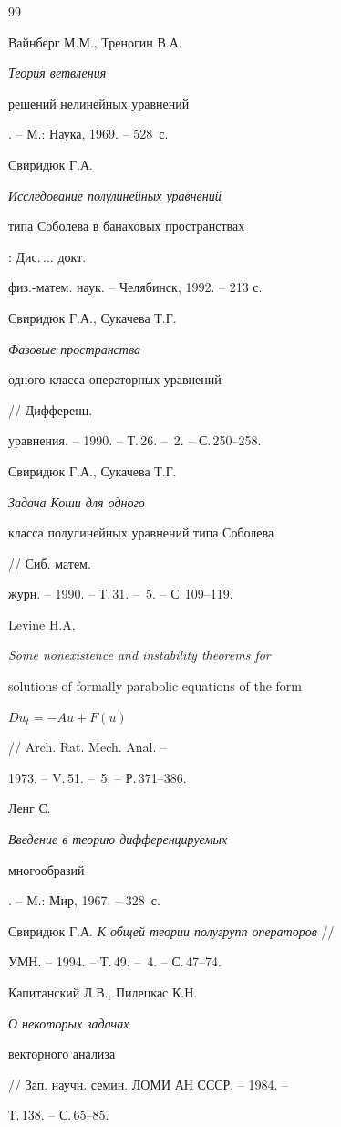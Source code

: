 \begin{thebibliography}{99}


Вайнберг М.М., Треногин В.А. {\em Теория ветвления


решений нелинейных уравнений}. -- М.: Наука, 1969. -- 528~с.




Свиридюк Г.А. {\em Исследование полулинейных уравнений


типа Соболева в банаховых пространствах}: Дис.\,$\dotsc$ докт.


физ.-матем. наук. -- Челябинск, 1992. -- 213 с.




Свиридюк Г.А., Сукачева Т.Г. {\em Фазовые пространства


одного класса операторных уравнений} // Дифференц.


уравнения. -- 1990. -- Т.\,26. -- \No\,2. -- С.\,250--258.




Свиридюк Г.А., Сукачева Т.Г. {\em Задача Коши для одного


класса полулинейных уравнений типа Соболева} // Сиб. матем.


журн. -- 1990. -- Т.\,31. -- \No\,5. -- С.\,109--119.




Levine H.A. {\em Some nonexistence and instability theorems for


solutions of formally parabolic equations of the form


$Du_t=-Au+F(u)$} // Arch. Rat. Mech. Anal. --


1973. -- V.\,51. -- \No\,5. -- Р.\,371--386.




Ленг С. {\em Введение в теорию дифференцируемых


многообразий}. -- М.: Мир, 1967. -- 328~с.




Свиридюк Г.А. {\em К общей теории полугрупп операторов} //


УМН. -- 1994. -- Т.\,49. -- \No\,4. -- С.\,47--74.




Капитанский Л.В., Пилецкас К.Н. {\em О некоторых задачах


векторного анализа} // Зап. научн. семин. ЛОМИ АН СССР. -- 1984. --


Т.\,138. -- С.\,65--85.





\end{thebibliography}





\vskip 2cm









\label{end}





